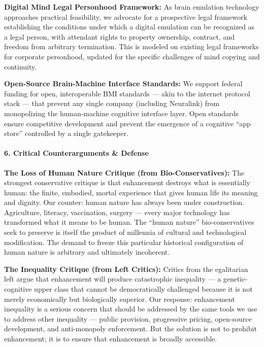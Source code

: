 \textbf{Digital Mind Legal Personhood Framework:} As brain emulation
technology approaches practical feasibility, we advocate for a
prospective legal framework establishing the conditions under which a
digital emulation can be recognized as a legal person, with attendant
rights to property ownership, contract, and freedom from arbitrary
termination. This is modeled on existing legal frameworks for corporate
personhood, updated for the specific challenges of mind copying and
continuity.

\textbf{Open-Source Brain-Machine Interface Standards:} We support
federal funding for open, interoperable BMI standards --- akin to the
internet protocol stack --- that prevent any single company (including
Neuralink) from monopolizing the human-machine cognitive interface
layer. Open standards ensure competitive development and prevent the
emergence of a cognitive ``app store'' controlled by a single
gatekeeper.

\paragraph{6. Critical Counterarguments \&
Defense}\label{critical-counterarguments-defense-16}

\textbf{The Loss of Human Nature Critique (from Bio-Conservatives):} The
strongest conservative critique is that enhancement destroys what is
essentially human: the finite, embodied, mortal experience that gives
human life its meaning and dignity. Our counter: human nature has always
been under construction. Agriculture, literacy, vaccination, surgery ---
every major technology has transformed what it means to be human. The
``human nature'' bio-conservatives seek to preserve is itself the
product of millennia of cultural and technological modification. The
demand to freeze this particular historical configuration of human
nature is arbitrary and ultimately incoherent.

\textbf{The Inequality Critique (from Left Critics):} Critics from the
egalitarian left argue that enhancement will produce catastrophic
inequality --- a genetic-cognitive upper class that cannot be
democratically challenged because it is not merely economically but
biologically superior. Our response: enhancement inequality is a serious
concern that should be addressed by the same tools we use to address
other inequality --- public provision, progressive pricing, open-source
development, and anti-monopoly enforcement. But the solution is not to
prohibit enhancement; it is to ensure that enhancement is broadly
accessible.

